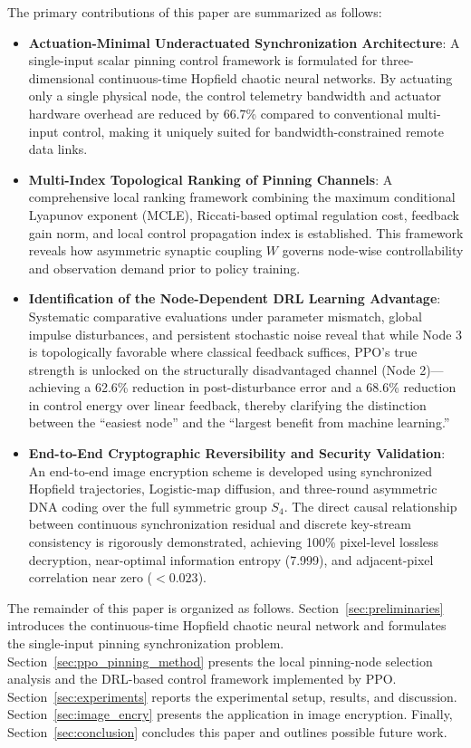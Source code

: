 \documentclass[a4paper,fleqn]{cas-dc}
\theoremstyle{plain}
\theoremstyle{definition}
\begin{document}
The primary contributions of this paper are summarized as follows:
\begin{itemize}
	\item \textbf{Actuation-Minimal Underactuated Synchronization Architecture}: A single-input scalar pinning control framework is formulated for three-dimensional continuous-time Hopfield chaotic neural networks. By actuating only a single physical node, the control telemetry bandwidth and actuator hardware overhead are reduced by 66.7\% compared to conventional multi-input control, making it uniquely suited for bandwidth-constrained remote data links.

	\item \textbf{Multi-Index Topological Ranking of Pinning Channels}: A comprehensive local ranking framework combining the maximum conditional Lyapunov exponent (MCLE), Riccati-based optimal regulation cost, feedback gain norm, and local control propagation index is established. This framework reveals how asymmetric synaptic coupling $W$ governs node-wise controllability and observation demand prior to policy training.

	\item \textbf{Identification of the Node-Dependent DRL Learning Advantage}: Systematic comparative evaluations under parameter mismatch, global impulse disturbances, and persistent stochastic noise reveal that while Node 3 is topologically favorable where classical feedback suffices, PPO's true strength is unlocked on the structurally disadvantaged channel (Node 2)—achieving a 62.6\% reduction in post-disturbance error and a 68.6\% reduction in control energy over linear feedback, thereby clarifying the distinction between the ``easiest node'' and the ``largest benefit from machine learning.''

	\item \textbf{End-to-End Cryptographic Reversibility and Security Validation}: An end-to-end image encryption scheme is developed using synchronized Hopfield trajectories, Logistic-map diffusion, and three-round asymmetric DNA coding over the full symmetric group $S_4$. The direct causal relationship between continuous synchronization residual and discrete key-stream consistency is rigorously demonstrated, achieving 100\% pixel-level lossless decryption, near-optimal information entropy (7.999), and adjacent-pixel correlation near zero ($<0.023$).
\end{itemize}

The remainder of this paper is organized as follows. Section~\ref{sec:preliminaries} introduces the continuous-time Hopfield chaotic neural network and formulates the single-input pinning synchronization problem. Section~\ref{sec:ppo_pinning_method} presents the local pinning-node selection analysis and the DRL-based control framework implemented by PPO. Section~\ref{sec:experiments} reports the experimental setup, results, and discussion. Section~\ref{sec:image_encry} presents the application in image encryption. Finally, Section~\ref{sec:conclusion} concludes this paper and outlines possible future work.
\end{document}
